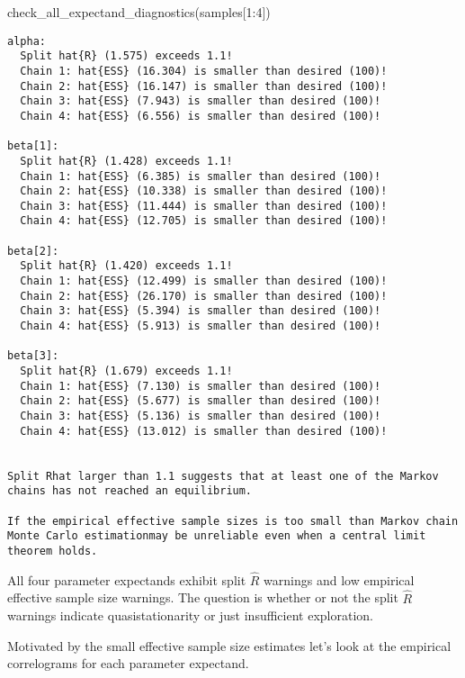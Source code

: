 \documentclass[
  letterpaper,
  DIV=11,
  numbers=noendperiod]{scrartcl}
\newenvironment{Shaded}{\begin{snugshade}}{\end{snugshade}}
\newcommand{\DecValTok}[1]{\textcolor[rgb]{0.68,0.00,0.00}{#1}}
\newcommand{\FunctionTok}[1]{\textcolor[rgb]{0.28,0.35,0.67}{#1}}
\newcommand{\NormalTok}[1]{\textcolor[rgb]{0.00,0.23,0.31}{#1}}
\newcommand{\SpecialCharTok}[1]{\textcolor[rgb]{0.37,0.37,0.37}{#1}}
\begin{document}
\begin{Shaded}
\begin{Highlighting}[]
\FunctionTok{check\_all\_expectand\_diagnostics}\NormalTok{(samples[}\DecValTok{1}\SpecialCharTok{:}\DecValTok{4}\NormalTok{])}
\end{Highlighting}
\end{Shaded}

\begin{verbatim}
alpha:
  Split hat{R} (1.575) exceeds 1.1!
  Chain 1: hat{ESS} (16.304) is smaller than desired (100)!
  Chain 2: hat{ESS} (16.147) is smaller than desired (100)!
  Chain 3: hat{ESS} (7.943) is smaller than desired (100)!
  Chain 4: hat{ESS} (6.556) is smaller than desired (100)!

beta[1]:
  Split hat{R} (1.428) exceeds 1.1!
  Chain 1: hat{ESS} (6.385) is smaller than desired (100)!
  Chain 2: hat{ESS} (10.338) is smaller than desired (100)!
  Chain 3: hat{ESS} (11.444) is smaller than desired (100)!
  Chain 4: hat{ESS} (12.705) is smaller than desired (100)!

beta[2]:
  Split hat{R} (1.420) exceeds 1.1!
  Chain 1: hat{ESS} (12.499) is smaller than desired (100)!
  Chain 2: hat{ESS} (26.170) is smaller than desired (100)!
  Chain 3: hat{ESS} (5.394) is smaller than desired (100)!
  Chain 4: hat{ESS} (5.913) is smaller than desired (100)!

beta[3]:
  Split hat{R} (1.679) exceeds 1.1!
  Chain 1: hat{ESS} (7.130) is smaller than desired (100)!
  Chain 2: hat{ESS} (5.677) is smaller than desired (100)!
  Chain 3: hat{ESS} (5.136) is smaller than desired (100)!
  Chain 4: hat{ESS} (13.012) is smaller than desired (100)!


Split Rhat larger than 1.1 suggests that at least one of the Markov
chains has not reached an equilibrium.

If the empirical effective sample sizes is too small than Markov chain
Monte Carlo estimationmay be unreliable even when a central limit
theorem holds.
\end{verbatim}

All four parameter expectands exhibit split \(\hat{R}\) warnings and low
empirical effective sample size warnings. The question is whether or not
the split \(\hat{R}\) warnings indicate quasistationarity or just
insufficient exploration.

Motivated by the small effective sample size estimates let's look at the
empirical correlograms for each parameter expectand.
\end{document}
